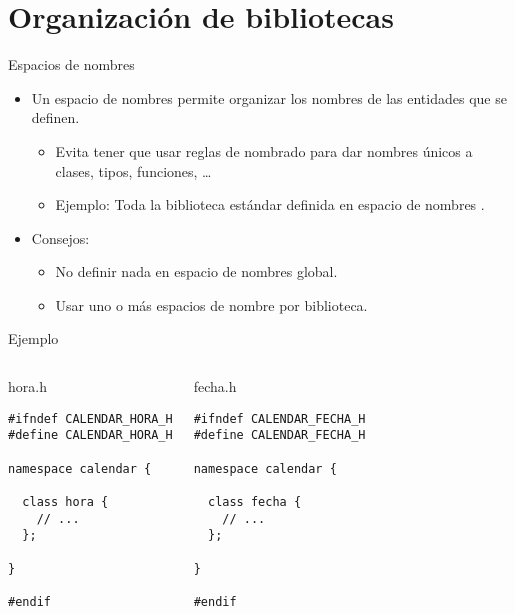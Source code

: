 \section{Organización de bibliotecas}

\begin{frame}[t]{Espacios de nombres}
\begin{itemize}
  \item Un espacio de nombres permite organizar los nombres de las entidades que se definen.
    \begin{itemize}
      \item Evita tener que usar reglas de nombrado para dar nombres únicos a clases, tipos, funciones, \ldots
      \item Ejemplo: Toda la biblioteca estándar definida en espacio de nombres .
    \end{itemize}

  \vfill
  \item Consejos:
    \begin{itemize}
      \item No definir nada en espacio de nombres global.
      \item Usar uno o más espacios de nombre por biblioteca.
    \end{itemize}
\end{itemize}
\end{frame}

\begin{frame}[t,fragile]{Ejemplo}
\begin{columns}


\begin{block}{hora.h}
\begin{lstlisting}
#ifndef CALENDAR_HORA_H
#define CALENDAR_HORA_H

namespace calendar {

  class hora {
    // ...
  };

}

#endif
\end{lstlisting}
\end{block}


\begin{block}{fecha.h}
\begin{lstlisting}
#ifndef CALENDAR_FECHA_H
#define CALENDAR_FECHA_H

namespace calendar {

  class fecha {
    // ...
  };

}

#endif
\end{lstlisting}
\end{block}

\end{columns}
\end{frame}

